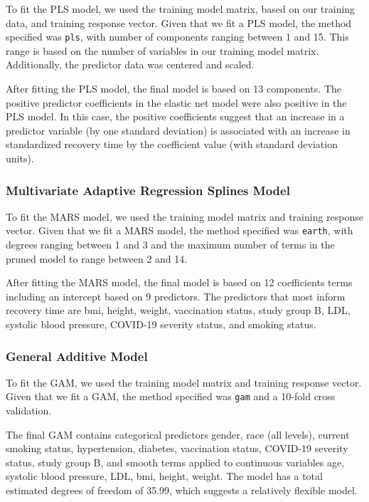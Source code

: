 \documentclass[
]{article}
\begin{document}
To fit the PLS model, we used the training model matrix, based on our
training data, and training response vector. Given that we fit a PLS
model, the method specified was \texttt{pls}, with number of components
ranging between 1 and 15. This range is based on the number of variables
in our training model matrix. Additionally, the predictor data was
centered and scaled.

After fitting the PLS model, the final model is based on 13 components.
The positive predictor coefficients in the elastic net model were also
positive in the PLS model. In this case, the positive coefficients
suggest that an increase in a predictor variable (by one standard
deviation) is associated with an increase in standardized recovery time
by the coefficient value (with standard deviation units).

\hypertarget{multivariate-adaptive-regression-splines-model}{%
\subsubsection{Multivariate Adaptive Regression Splines
Model}\label{multivariate-adaptive-regression-splines-model}}

To fit the MARS model, we used the training model matrix and training
response vector. Given that we fit a MARS model, the method specified
was \texttt{earth}, with degrees ranging between 1 and 3 and the maximum
number of terms in the pruned model to range between 2 and 14.

After fitting the MARS model, the final model is based on 12
coefficients terms including an intercept based on 9 predictors. The
predictors that most inform recovery time are bmi, height, weight,
vaccination status, study group B, LDL, systolic blood pressure,
COVID-19 severity status, and smoking status.

\hypertarget{general-additive-model}{%
\subsubsection{General Additive Model}\label{general-additive-model}}

To fit the GAM, we used the training model matrix and training response
vector. Given that we fit a GAM, the method specified was \texttt{gam}
and a 10-fold cross validation.

The final GAM contains categorical predictors gender, race (all levels),
current smoking status, hypertension, diabetes, vaccination status,
COVID-19 severity status, study group B, and smooth terms applied to
continuous variables age, systolic blood pressure, LDL, bmi, height,
weight. The model has a total estimated degrees of freedom of 35.99,
which suggests a relatively flexible model.
\end{document}
